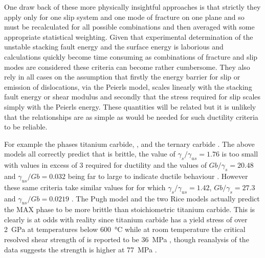 One draw back of these more physically insightful approaches is that strictly they apply only for one slip system and one mode of fracture on one plane and so must be recalculated for all possible combinations and then averaged with some appropriate statistical weighting. Given that experimental determination of the unstable stacking fault energy and the surface energy is laborious and calculations quickly become time consuming as combinations of fracture and slip modes are considered these criteria can become rather cumbersome. They also rely in all cases on the assumption that firstly the energy barrier for slip or emission of dislocations, via the Peierls model, scales linearly with the stacking fault energy or shear modulus and secondly that the stress required for slip scales simply with the Peierls energy. These quantities will be related but it is unlikely that the relationships are as simple as would be needed for such ductility criteria to be reliable.

For example the phases titanium carbide, , and the ternary carbide . The above models all correctly predict that  is brittle, the value of $\gamma_s / \gamma_{us} = 1.76$ is too small with values in excess of 3 required for ductility \cite{Price1992,Yu2003} and the values of $Gb/\gamma_s = 20.48$ and $\gamma_{us} / Gb = 0.032$ being far to large to indicate ductile behaviour \cite{Yu2003,Medvedeva2011}. However these same criteria take similar values for  for which $\gamma_s / \gamma_{us} = 1.42$, $Gb/\gamma_s = 27.3$ and $\gamma_{us} / Gb = 0.0219$ \cite{Medvedeva2011,Farle2015}. The Pugh model and the two Rice models \cite{Pugh1954,rice1974,Rice1992} actually predict the MAX phase to be more brittle than stoichiometric titanium carbide. This is clearly is at odds with reality since titanium carbide has a yield stress of over \SI{2}{\giga\pascal} at temperatures below \SI{600}{\celsius} \cite{Miracle1983} while at room temperature the critical resolved shear strength of  is reported to be \SI{36}{\mega\pascal} \cite{Barsoum1999}, though reanalysis of the data suggests the strength is higher at \SI{77}{\mega\pascal} \cite{Humphrey2012}.


